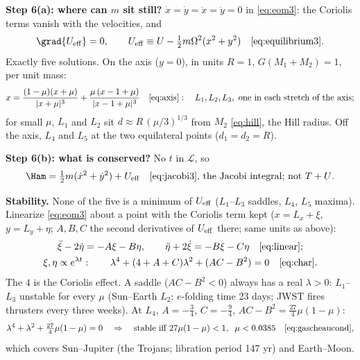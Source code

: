 \documentclass[10pt]{article}
\newcommand{\Om}{\Omega}
\newcommand{\Lag}{\mathcal{L}}
\newcommand{\Ueff}{U_{\rm eff}}
\begin{document}
\textbf{Step 6(a): where can $m$ sit still?} $\dot x = \dot y = \ddot x = \ddot y = 0$ in
\eqref{eq:eom3}: the Coriolis terms vanish with the velocities, and
\begin{equation*}
  \grad{\Ueff} = 0, \qquad \Ueff \equiv U - \tfrac12 m\Om^2(x^2 + y^2) \quad\text{\eqref{eq:equilibrium3}} .
\end{equation*}
Exactly five solutions. On the axis ($y = 0$), in units $R = 1$, $G(M_1 + M_2) = 1$, per unit mass:
\begin{equation*}
  x = \frac{(1-\mu)(x+\mu)}{|x+\mu|^3} + \frac{\mu\,(x-1+\mu)}{|x-1+\mu|^3} \quad\text{\eqref{eq:axis}}:
  \quad L_1, L_2, L_3, \text{ one in each stretch of the axis};
\end{equation*}
for small $\mu$, $L_1$ and $L_2$ sit $d \approx R\,(\mu/3)^{1/3}$ from $M_2$ \eqref{eq:hill}, the
Hill radius. Off the axis, $L_4$ and $L_5$ at the two equilateral points ($d_1 = d_2 = R$).

\textbf{Step 6(b): what is conserved?} No $t$ in $\Lag$, so
\begin{equation*}
  \Ham = \tfrac12 m(\dot x^2 + \dot y^2) + \Ueff \quad\text{\eqref{eq:jacobi3}, the Jacobi integral; not $T + U$.}
\end{equation*}

\textbf{Stability.} None of the five is a minimum of $\Ueff$ ($L_1$--$L_3$ saddles, $L_4$, $L_5$
maxima). Linearize \eqref{eq:eom3} about a point with the Coriolis term kept ($x = L_x + \xi$,
$y = L_y + \eta$; $A, B, C$ the second derivatives of $\Ueff$ there; same units as above):
\begin{gather*}
  \ddot\xi - 2\dot\eta = -A\xi - B\eta, \qquad \ddot\eta + 2\dot\xi = -B\xi - C\eta \quad\text{\eqref{eq:linear}}; \\
  \xi, \eta \propto e^{\lambda t}: \qquad
  \lambda^4 + (4 + A + C)\lambda^2 + (AC - B^2) = 0 \quad\text{\eqref{eq:char}} .
\end{gather*}
The $4$ is the Coriolis effect. A saddle ($AC - B^2 < 0$) always has a real $\lambda > 0$:
$L_1$--$L_3$ unstable for every $\mu$ (Sun--Earth $L_2$: $e$-folding time 23 days; JWST fires
thrusters every three weeks). At $L_4$, $A = -\tfrac34$, $C = -\tfrac94$, $AC - B^2 = \tfrac{27}{4}\mu(1-\mu)$:
\begin{equation*}
  \lambda^4 + \lambda^2 + \tfrac{27}{4}\mu(1-\mu) = 0 \quad\Rightarrow\quad
  \text{stable iff } 27\mu(1-\mu) < 1, \;\; \mu < 0.0385 \quad\text{\eqref{eq:gascheaucond}},
\end{equation*}
which covers Sun--Jupiter (the Trojans; libration period 147 yr) and Earth--Moon.
\end{document}
